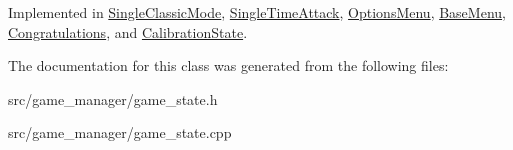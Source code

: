 Implemented in \hyperlink{class_single_classic_mode_adf46353472b81fe44128c0621de623df}{Single\-Classic\-Mode}, \hyperlink{class_single_time_attack_ab906c638bd4786669217deee446f3d4f}{Single\-Time\-Attack}, \hyperlink{class_options_menu_ad653e8ad74119e2fdac3fdcabcb8119f}{Options\-Menu}, \hyperlink{class_base_menu_a4679a8f7c2872606910baa1b08fe0ba1}{Base\-Menu}, \hyperlink{class_congratulations_a2dc0a7638d81154f64776b4f964a6a5b}{Congratulations}, and \hyperlink{class_calibration_state_ab7464c22c3f9f2a4bd3acef00b513649}{Calibration\-State}.



The documentation for this class was generated from the following files\-:\begin{DoxyCompactItemize}
\item 
src/game\-\_\-manager/game\-\_\-state.\-h\item 
src/game\-\_\-manager/game\-\_\-state.\-cpp\end{DoxyCompactItemize}
